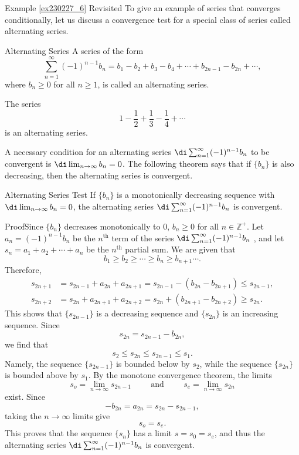 \begin{example}{\linkt Example \ref{ex230227_6} Revisited}
 To give  an example of series that converges conditionally, let us   discuss a convergence test for a special class of series called alternating series.

\begin{definition}{Alternating Series}
A series of the form \[\sum_{n=1}^{\infty}(-1)^{n-1}b_n=b_1-b_2+b_3-b_4+\cdots+b_{2n-1}-b_{2n}+\cdots,\]where $b_n\geq 0$ for all $n\geq 1$, is called an alternating series.
\end{definition}

\begin{example}[label=ex230227_12]{}
The series 
\[1-\frac{1}{2}+\frac{1}{3}-\frac{1}{4}+\cdots\] is an alternating series.
\end{example} 
A necessary condition for an alternating series $\di\sum_{n=1}^{\infty}(-1)^{n-1}b_n$ to be convergent is $\di\lim_{n\to\infty}b_n=0$. The following theorem says that if $\{b_n\}$ is also decreasing, then the alternating series is convergent. 

\begin{theorem}[label=230227_15]{Alternating Series Test}
If  $\{b_n\}$ is a monotonically decreasing sequence with $\di\lim_{n\to \infty}b_n=0$, the alternating series $\di\sum_{n=1}^{\infty}(-1)^{n-1}b_n$ is convergent.
\end{theorem}
\begin{myproof}{Proof}Since $\{b_n\}$ decreases monotonically to 0, $b_n\geq 0$ for all $n\in\mathbb{Z}^+$. 
Let $a_n=(-1)^{n-1}b_n$ be the $n^{\text{th}}$ term of the series $\di\sum_{n=1}^{\infty}(-1)^{n-1}b_n$ , and let $s_n=a_1+a_2+\cdots+a_n$ be the $n^{\text{th}}$ partial sum. We are given that 
\[b_1\geq b_2\geq \cdots\geq b_n\geq b_{n+1}\cdots.\]
Therefore,
\begin{align*}
s_{2n+1}&= s_{2n-1}+a_{2n}+a_{2n+1}=s_{2n-1}-(b_{2n}-b_{2n+1})\leq s_{2n-1},\\
s_{2n+2}&=s_{2n}+a_{2n+1}+a_{2n+2} =s_{2n}+(b_{2n+1}-b_{2n+2})\geq s_{2n}. 
\end{align*}This shows that $\{s_{2n-1}\}$ is a decreasing sequence and $\{s_{2n }\}$ is an increasing sequence.
Since 
\[s_{2n }=s_{2n-1}-b_{2n},\]
we find that 
\[s_2\leq s_{2n}\leq s_{2n-1}\leq s_1.\]
Namely, the sequence $\{s_{2n-1}\}$ is bounded below by $s_2$, while the sequence $\{s_{2n}\}$ is bounded above by $s_1$. By the monotone convergence theorem, the limits
\[s_o=\lim_{n\to\infty}s_{2n-1}\hspace{1cm}\text{and}\hspace{1cm}s_e=\lim_{n\to\infty}s_{2n}\] exist.  Since
\[-b_{2n}=a_{2n}=s_{2n}-s_{2n-1},\] 
taking the $n\to \infty$ limits give
\[s_o=s_e.\]\bp
This proves that the sequence $\{s_n\}$ has a limit $s=s_0=s_e$, and thus the alternating series $\di\sum_{n=1}^{\infty}(-1)^{n-1}b_n$ is convergent.



\end{myproof}
\end{example}
